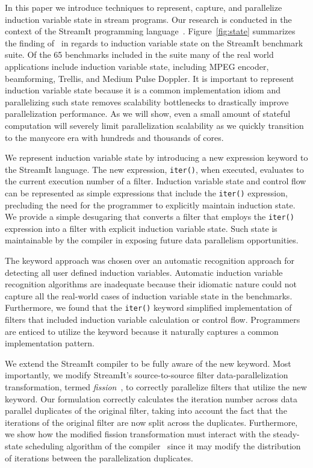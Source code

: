  
In this paper we introduce techniques to represent, capture, and
parallelize induction variable state in stream programs. Our research
is conducted in the context of the StreamIt programming
language~\cite{streamitcc}.  Figure~\ref{fig:state} summarizes the
finding of~\cite{streamit-suite} in regards to induction variable
state on the StreamIt benchmark suite.  Of the 65 benchmarks included
in the suite many of the real world applications include induction
variable state, including MPEG encoder, beamforming, Trellis, and Medium
Pulse Doppler.
It is important to represent induction variable state because it is a
common implementation idiom and parallelizing such state removes
scalability bottlenecks to drastically improve parallelization
performance. As we will show, even a small amount of stateful
computation will severely limit parallelization scalability as we
quickly transition to the manycore era with hundreds and thousands of
cores.

We represent induction variable state by introducing a new expression
keyword to the StreamIt language. The new expression, {\tt iter()},
when executed, evaluates to the current execution number of a filter.
Induction variable state and control flow can be represented as simple
expressions that include the {\tt iter()} expression, precluding the
need for the programmer to explicitly maintain induction state. We
provide a simple desugaring that converts a filter that employs the
{\tt iter()} expression into a filter with explicit induction
variable state.  Such state is maintainable by the compiler in 
exposing future data parallelism opportunities.

The keyword approach was chosen over an automatic recognition approach
for detecting all user defined induction variables. Automatic induction 
variable recognition algorithms are inadequate
because their idiomatic nature could not capture all the real-world
cases of induction variable state in the benchmarks.  Furthermore, we
found that the {\tt iter()} keyword simplified implementation of
filters that included induction variable calculation or control flow.
Programmers are enticed to utilize the keyword because it naturally
captures a common implementation pattern.

We extend the StreamIt compiler to be fully aware of the new keyword.
Most importantly, we modify StreamIt's source-to-source filter 
data-parallelization transformation, termed {\it
  fission}~\cite{streamit-asplos}, to correctly parallelize filters
that utilize the new keyword. Our formulation correctly calculates the
iteration number across data parallel duplicates of the original
filter, taking into account the fact that the iterations of the original
filter are now split across the duplicates. Furthermore, we show how
the modified fission transformation must interact with the
steady-state scheduling algorithm of the
compiler~\cite{karczmarek-lctes03} since it may modify the
distribution of iterations between the parallelization duplicates.

